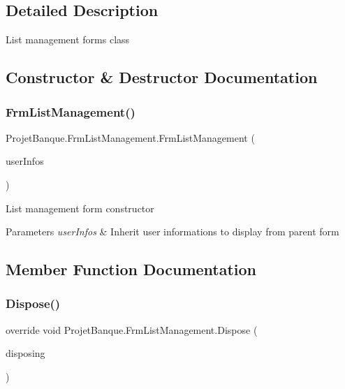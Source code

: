\subsection{Detailed Description}
List management form\textquotesingle{}s class 



\subsection{Constructor \& Destructor Documentation}
\mbox{\label{class_projet_banque_1_1_frm_list_management_aefda22a1f107406811a2ed39f44342da}} 
\subsubsection{\texorpdfstring{FrmListManagement()}{FrmListManagement()}}
{\footnotesize\ttfamily Projet\+Banque.\+Frm\+List\+Management.\+Frm\+List\+Management (\begin{DoxyParamCaption}\item[{\mbox{\hyperlink{class_projet_banque_1_1_enterprise_user}{Enterprise\+User}}}]{user\+Infos }\end{DoxyParamCaption})}



List management form constructor 


\begin{DoxyParams}{Parameters}
{\em user\+Infos} & Inherit user informations to display from parent form\\
\hline
\end{DoxyParams}


\subsection{Member Function Documentation}
\mbox{\label{class_projet_banque_1_1_frm_list_management_a9f20a69bc9b201bd02203ad8a3a03bff}} 
\subsubsection{\texorpdfstring{Dispose()}{Dispose()}}
{\footnotesize\ttfamily override void Projet\+Banque.\+Frm\+List\+Management.\+Dispose (\begin{DoxyParamCaption}\item[{bool}]{disposing }\end{DoxyParamCaption})\hspace{0.3cm}{\ttfamily [protected]}}



